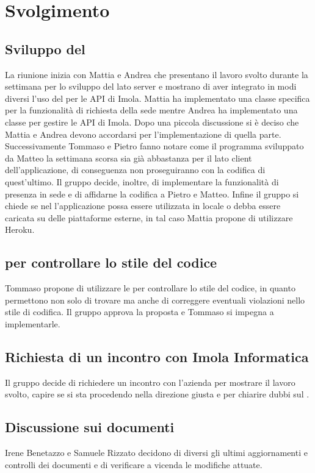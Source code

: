 \section{Svolgimento}
\subsection{Sviluppo del }
La riunione inizia con Mattia e Andrea che presentano il lavoro svolto durante la settimana per lo sviluppo del  lato server e
mostrano di aver integrato in modi diversi l'uso del  per le API di Imola. Mattia ha implementato
una classe specifica per la funzionalità di richiesta della sede mentre Andrea ha implementato una classe per gestire le API di Imola.
Dopo una piccola discussione si è deciso che Mattia e Andrea devono accordarsi per l'implementazione di quella parte. Successivamente
Tommaso e Pietro fanno notare come il programma sviluppato da Matteo la settimana scorsa sia già abbastanza per il lato client dell'applicazione,
di conseguenza non proseguiranno con la codifica di quest'ultimo. Il gruppo decide, inoltre, di implementare la funzionalità di presenza in sede
e di affidarne la codifica a Pietro e Matteo. Infine il gruppo si chiede se nel  l'applicazione possa essere utilizzata 
in locale o debba essere caricata su delle piattaforme esterne, in tal caso Mattia propone di utilizzare Heroku.

\subsection{ per controllare lo stile del codice}
Tommaso propone di utilizzare le  per controllare lo stile del codice, in quanto permettono non solo
di trovare ma anche di correggere eventuali violazioni nello stile di codifica. Il gruppo approva la proposta e Tommaso
si impegna a implementarle.

\subsection{Richiesta di un incontro con Imola Informatica}
Il gruppo decide di richiedere un incontro con l'azienda per mostrare il lavoro svolto, capire se si sta procedendo
nella direzione giusta e per chiarire dubbi sul .

\subsection{Discussione sui documenti}
Irene Benetazzo e Samuele Rizzato decidono di diversi gli ultimi aggiornamenti e controlli dei documenti e
di verificare a vicenda le modifiche attuate.